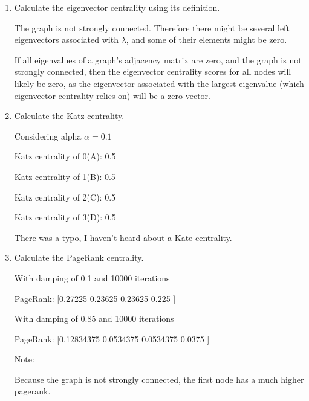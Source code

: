 \documentclass{amsart}
\theoremstyle{definition}
\theoremstyle{remark}
\numberwithin{equation}{section}
\begin{document}
\begin{enumerate}
\begin{enumerate}
\vspace{0.2cm}
\item Calculate the eigenvector centrality using its definition. \vspace{0.2cm}

The graph is not strongly connected. Therefore there might be several left eigenvectors associated with 
$\lambda$, and some of their elements might be zero.

If all eigenvalues of a graph's adjacency matrix are zero, and the graph is not strongly connected, then the eigenvector centrality scores for all nodes will likely be zero, as the eigenvector associated with the largest eigenvalue (which eigenvector centrality relies on) will be a zero vector. 

\vspace{0.2cm}
\item Calculate the Katz centrality. \vspace{0.2cm}

Considering alpha $\alpha = 0.1$

Katz centrality of 0(A): 0.5

Katz centrality of 1(B): 0.5

Katz centrality of 2(C): 0.5

Katz centrality of 3(D): 0.5


There was a typo, I haven't heard about a Kate centrality.
\vspace{0.2cm}
\item Calculate the PageRank centrality. \vspace{0.2cm}

With damping of 0.1 and 10000 iterations

PageRank: [0.27225 0.23625 0.23625 0.225  ]

With damping of 0.85 and 10000 iterations

PageRank: [0.12834375 0.0534375  0.0534375  0.0375    ]

Note:

Because the graph is not strongly connected, the first node has a much higher pagerank.



\end{enumerate}
\end{enumerate}
\end{document}
